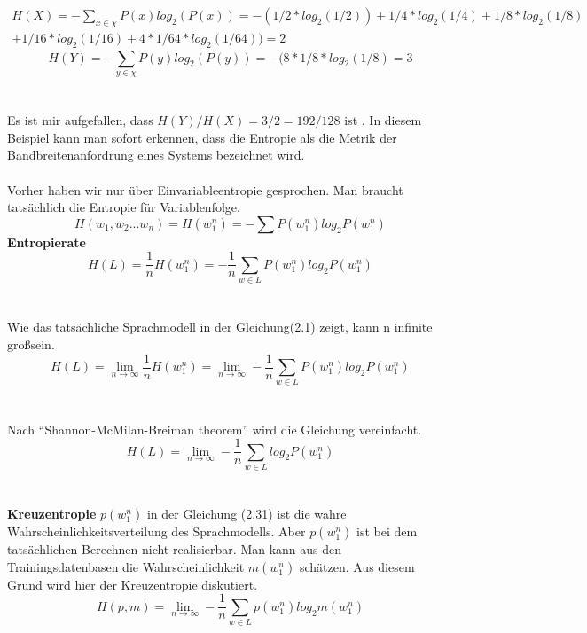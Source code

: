 \begin{multline}
H(X) =-\sum_{x\in\chi}P(x)log_{2}(P(x))=-(1/2*log_{2}(1/2))+1/4*log_{2}(1/4)+1/8*log_{2}(1/8)\\
+1/16*log_{2}(1/16)+4*1/64*log_{2}(1/64))=2
\end{multline}
\begin{equation}
H(Y)=-\sum_{y\in\chi}P(y)log_{2}(P(y))=-(8*1/8*log_{2}(1/8)=3
\end{equation}
\\
\\
Es ist mir aufgefallen, dass $H(Y)/H(X)=3/2=192/128$ ist . In diesem Beispiel kann man sofort erkennen, dass die Entropie als die Metrik der Bandbreitenanfordrung eines Systems bezeichnet wird.
\\
\\   
Vorher haben wir nur \"uber Einvariableentropie gesprochen. Man braucht tats\"achlich die Entropie f\"ur Variablenfolge.
\begin{equation}
H(w_{1},w_{2}...w_{n})=H(w_{1}^{n})=-\sum{P(w_{1}^{n})log_{2}P(w_{1}^{n})}
\end{equation}
\textbf{Entropierate}
\begin{equation}
H(L)=\frac{1}{n}H(w_{1}^{n})=-\frac{1}{n}\sum_{w\in L}P(w_{1}^{n})log_{2}P(w_{1}^{n})
\end{equation}
\\
\\
Wie das tats\"achliche Sprachmodell in der Gleichung(2.1) zeigt, kann n infinite gro\ss sein.
\begin{equation}
H(L)=\lim_{n\to\infty}\frac{1}{n}H(w_{1}^{n})=\lim_{n\to\infty}-\frac{1}{n}\sum_{w\in L}P(w_{1}^{n})log_{2}P(w_{1}^{n})
\end{equation}
\\
\\
Nach "`Shannon-McMilan-Breiman theorem"' wird die Gleichung vereinfacht.
\begin{equation}
H(L)=\lim_{n\to\infty}-\frac{1}{n}\sum_{w\in L}log_{2}P(w_{1}^{n})
\end{equation}
\\
\\
\textbf{Kreuzentropie}
$p(w_{1}^{n})$ in der Gleichung (2.31) ist die wahre Wahrscheinlichkeitsverteilung des Sprachmodells. Aber $p(w_{1}^{n})$ ist bei dem tats\"achlichen Berechnen nicht realisierbar. Man kann aus den Trainingsdatenbasen die Wahrscheinlichkeit $m(w_{1}^{n})$ sch\"atzen. Aus diesem Grund  wird hier der Kreuzentropie diskutiert.
\begin{equation}
H(p,m)=\lim_{n\to\infty}-\frac{1}{n}\sum_{w\in L}p(w_{1}^{n})log_{2}m(w_{1}^{n})
\end{equation}
